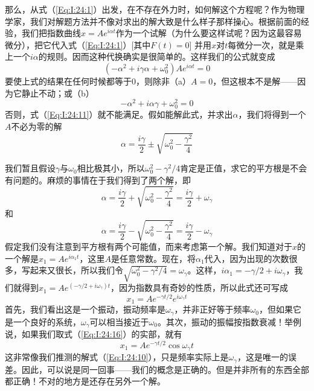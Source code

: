 那么，从式（\ref{Eq:I:24:1}）出发，在不存在外力时，如何解这个方程呢？作为物理学家，我们对解题方法并不像对求出的解大致是什么样子那样操心。根据前面的经验，我们把指数曲线$x=Ae^{i\alpha t}$作为一个试解（为什么要这样试呢？因为这最容易微分），把它代入式（\ref{Eq:I:24:1}）[其中$F(t)=0$] 并用$x$对$t$每微分一次，就是乘上一个$i\alpha$的规则。因而这种代换确实是很简单的。这样我们的公式就变成
\begin{equation}
    \label{Eq:I:24:11}
    (-\alpha^2 + i\gamma\alpha + \omega_0^2)Ae^{i\alpha t} = 0
\end{equation}
要使上式的结果在任何时候都等于0，则除非（a）$A=0$，但这根本不是解——因为它静止不动；或（b）
\begin{equation}
    \label{Eq:I:24:12}
    -\alpha^2 + i\alpha\gamma + \omega_0^2 = 0
\end{equation}
否则，式（\ref{Eq:I:24:11}）就不能满足。假如能解此式，并求出$\alpha$，我们将得到一个$A$不必为零的解
\begin{equation}
    \label{Eq:I:24:13}
    \alpha = \frac{i\gamma}{2} \pm \sqrt{\omega_0^2 - \frac{\gamma^2}{4}}
\end{equation}

我们暂且假设$\gamma$与$\omega_0$相比极其小，所以$\omega_0^2 - \gamma^2/4$肯定是正值，求它的平方根是不会有问题的。麻烦的事情在于我们得到了两个解，即
\begin{equation}
    \label{Eq:I:24:14}
    \alpha = \frac{i\gamma}{2} + \sqrt{\omega_0^2 - \frac{\gamma^2}{4}} = \frac{i\gamma}{2} + \omega_\gamma
\end{equation}
和
\begin{equation}
    \label{Eq:I:24:15}
    \alpha = \frac{i\gamma}{2} - \sqrt{\omega_0^2 - \frac{\gamma^2}{4}} = \frac{i\gamma}{2} - \omega_\gamma
\end{equation}
假定我们没有注意到平方根有两个可能值，而来考虑第一个解。我们知道对于$x$的一个解是$x_1=Ae^{i\alpha_1t}$，这里$A$是任意常数。现在，将$\alpha_1$代入，因为出现的次数很多，写起来又很长，所以我们令$\sqrt{\omega_0^2 - \gamma^2/4}=\omega_\gamma$。这样，$i\alpha_1 = -\gamma/2 + i\omega_\gamma$，我们就得到$x_1 = Ae^{(-\gamma/2 + i\omega_\gamma)t}$，因为指数具有奇妙的性质，所以此式还可写成
\begin{equation}
    \label{Eq:I:24:16}
    x_1 = Ae^{-\gamma t/2}e^{i\omega_\gamma t}
\end{equation}
首先，我们看出这是一个振动，振动频率是$\omega_\gamma$，并非正好等于频率$\omega_0$，但如果它是一个良好的系统，$\omega_\gamma$可以相当接近于$\omega_0$。其次，振动的振幅按指数衰减！举例说，如果我们取式（\ref{Eq:I:24:16}）的实部，就有
\begin{equation}
    \label{Eq:I:24:17}
    x_1 = Ae^{-\gamma t/2}\cos\omega_\gamma t
\end{equation}
这非常像我们推测的解式（\ref{Eq:I:24:10}），只是频率实际上是$\omega_\gamma$，这是唯一的误差。因此，可以说是同一回事——我们的概念是正确的。但是并非所有的东西全部都正确！不对的地方是还存在另外一个解。

